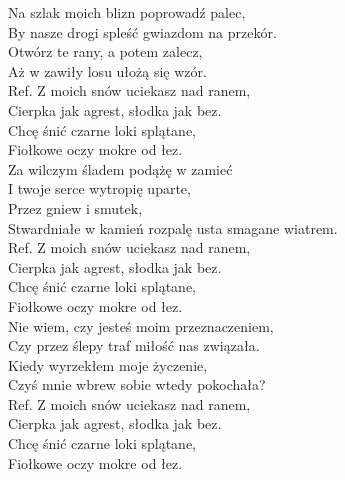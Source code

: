 
\begin{flushleft}
Na szlak moich blizn poprowadź palec,  \\
By nasze drogi spleść gwiazdom na przekór. \\
Otwórz te rany, a potem zalecz, \\
Aż w zawiły losu ułożą się wzór.  \\
\vskip 3mm
Ref. Z moich snów uciekasz nad ranem,  \\
\hspace{0.9cm}Cierpka jak agrest, słodka jak bez. \\
\hspace{0.9cm}Chcę śnić czarne loki splątane,  \\
\hspace{0.9cm}Fiołkowe oczy mokre od łez. \\
\vskip 3mm
Za wilczym śladem podążę w zamieć \\
I twoje serce wytropię uparte, \\
Przez gniew i smutek,  \\
Stwardniałe w kamień rozpalę usta smagane wiatrem.  \\
\vskip 3mm
Ref. Z moich snów uciekasz nad ranem,  \\
\hspace{0.9cm}Cierpka jak agrest, słodka jak bez. \\
\hspace{0.9cm}Chcę śnić czarne loki splątane,  \\
\hspace{0.9cm}Fiołkowe oczy mokre od łez. \\
\vskip 3mm
Nie wiem, czy jesteś moim przeznaczeniem, \\
Czy przez ślepy traf miłość nas związała. \\
Kiedy wyrzekłem moje życzenie, \\
Czyś mnie wbrew sobie wtedy pokochała? \\
\vskip 3mm
Ref. Z moich snów uciekasz nad ranem,  \\
\hspace{0.9cm}Cierpka jak agrest, słodka jak bez. \\
\hspace{0.9cm}Chcę śnić czarne loki splątane,  \\
\hspace{0.9cm}Fiołkowe oczy mokre od łez. \\
\vskip 3mm
\end{flushleft}
\clearpage
